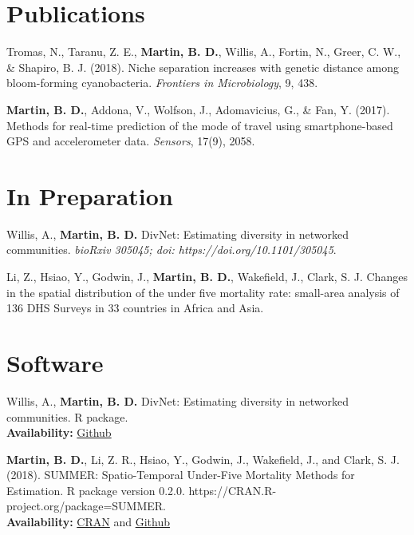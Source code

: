 \documentclass[margin,centered]{res}
\begin{document}
\begin{resume}
\section{\sc Publications}

Tromas, N.,  Taranu, Z. E., \textbf{Martin, B. D.}, Willis, A., Fortin, N., Greer, C. W., \& Shapiro, B. J. (2018). Niche separation increases with genetic distance among bloom-forming cyanobacteria. \textit{Frontiers in Microbiology}, 9, 438.

\textbf{Martin, B. D.}, Addona, V., Wolfson, J., Adomavicius, G., \& Fan, Y. (2017). Methods for real-time prediction of the mode of travel using smartphone-based GPS and accelerometer data. \textit{Sensors}, 17(9), 2058.

\section{\sc In Preparation}

Willis, A., \textbf{Martin, B. D.} DivNet: Estimating diversity in networked communities. 
\textit{bioRxiv 305045; doi: https://doi.org/10.1101/305045}.

Li, Z., Hsiao, Y., Godwin, J., \textbf{Martin, B. D.}, Wakefield, J., Clark, S. J. Changes in the spatial distribution of the under five mortality rate: small-area analysis of 136 DHS Surveys in 33 countries in Africa and Asia.




\section{\sc Software} 
Willis, A., \textbf{Martin, B. D.} DivNet: Estimating diversity in networked communities. R package. \\ 
\textbf{Availability:} \href{https://github.com/adw96/DivNet}{Github}

\textbf{Martin, B. D.}, Li, Z. R., Hsiao, Y., Godwin, J., Wakefield, J., and 
  Clark, S. J. (2018). SUMMER: Spatio-Temporal Under-Five Mortality Methods for Estimation. R
  package version 0.2.0. https://CRAN.R-project.org/package=SUMMER. \\
\textbf{Availability:} \href{https://CRAN.R-project.org/package=SUMMER}{CRAN} and \href{https://github.com/bryandmartin/SUMMER}{Github}



\end{resume}
\end{document}
